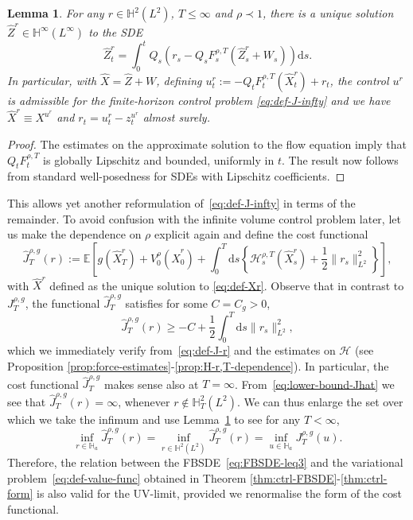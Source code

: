 \documentclass[11pt, a4paper]{scrartcl}
\numberwithin{equation}{section}
\theoremstyle{plain}
\newtheorem{lemma}[foo]{Lemma}
\theoremstyle{remark}
\newcommand{\assign}{:=}
\newcommand{\mathd}{\mathrm{d}}
\newcommand{\nin}{\not\in}
\begin{document}
\begin{lemma}
	\label{lem:u(r)}For any $r \in \mathbb{H}^2 (L^2)$, $T \leqslant \infty$ and
	$\rho \prec 1$, there is a unique solution $\hat{Z}^r \in \mathbb{H}^{\infty}
		(L^{\infty})$ to the SDE
	\begin{equation}
		\hat{Z}^r_t = \int_0^t Q_s (r_s - Q_s F^{\rho, T}_s (\hat{Z}^r_s + W_s))
		\mathd s. \label{eq:def-Xr}
	\end{equation}
	In particular, with $\hat{X} = \hat{Z} + W$, defining $u^r_t \assign - Q_t
		F^{\rho, T}_t (\hat{X}^r_t) + r_t$, the control $u^r$ is admissible for the
	finite-horizon control problem \eqref{eq:def-J-infty} and we have $\hat{X}^r
		\equiv X^{u^r}$ and $r_t = u^r_t - z_t^{u^r}$ almost surely.
\end{lemma}

\begin{proof}
	The estimates on the approximate solution to the flow equation imply that
	$Q_t F_t^{\rho, T}$ is globally Lipschitz and bounded, uniformly in $t$. The
	result now follows from standard well-posedness for SDEs with Lipschitz
	coefficients.
\end{proof}

This allows yet another reformulation of~\eqref{eq:def-J-infty} in terms of
the remainder. To avoid confusion with the infinite volume control problem
later, let us make the dependence on $\rho$ explicit again and define the cost
functional
\begin{equation}
	\hat{J}_T^{\rho, g} (r) \assign \mathbb{E} \left[ g (\hat{X}_T^r) +
		V^{\rho}_0 (\hat{X}_0^r) + \int_0^T \mathd s \left\{ \mathcal{H}^{\rho, T}_s
		(\hat{X}_s^r) + \frac{1}{2} \| r_s \|^2_{L^2} \right\} \right]
	\label{eq:def-J-r},
\end{equation}
with $\hat{X}^r$ defined as the unique solution to \eqref{eq:def-Xr}. Observe
that in contrast to $J^{\rho, g}_T$, the functional $\hat{J}^{\rho, g}_T$
satisfies for some $C = C_g > 0$,
\begin{equation}
	\hat{J}^{\rho, g}_T (r) \geqslant - C + \frac{1}{2}  \int_0^T \mathd s \|
	r_s \|^2_{L^2}, \label{eq:lower-bound-Jhat}
\end{equation}
which we immediately verify from~\eqref{eq:def-J-r} and the estimates on
$\mathcal{H}$ (see Proposition
\ref{prop:force-estimates}-\ref{prop:H-r,T-dependence}). In particular, the
cost functional $\hat{J}_T^{\rho, g}$ makes sense also at $T = \infty$.
From~\eqref{eq:lower-bound-Jhat} we see that $\hat{J}^{\rho, g}_T (r) =
	\infty$, whenever $r \nin \mathbb{H}^2_T (L^2)$. We can thus enlarge the set
over which we take the infimum and use Lemma~\ref{lem:u(r)} to see
for any $T < \infty$,
\[ \inf_{r \in \mathbb{H}_a}  \hat{J}_T^{\rho, g} (r) = \inf_{r \in
		\mathbb{H}^2 (L^2)}  \hat{J}_T^{\rho, g} (r) = \inf_{u \in \mathbb{H}_a}
	J^{\rho, g}_T (u) . \]
Therefore, the relation between the FBSDE~\eqref{eq:FBSDE-leq3} and the variational
problem~\eqref{eq:def-value-func} obtained in Theorem
\ref{thm:ctrl-FBSDE}-\ref{thm:ctrl-form} is also valid for the UV-limit,
provided we renormalise the form of the cost functional.
\end{document}
